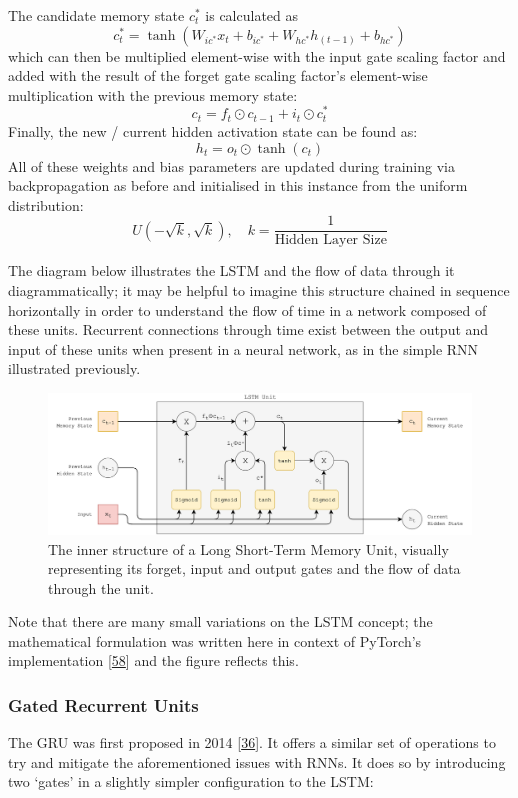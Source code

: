 \documentclass[12pt,]{article}
\begin{document}
The candidate memory state \(c^*_t\) is calculated as
\[c^*_t = \tanh(W_{ic^*} x_t + b_{ic^*} + W_{hc^*} h_{(t-1)} + b_{hc^*})\]
which can then be multiplied element-wise with the input gate scaling
factor and added with the result of the forget gate scaling factor's
element-wise multiplication with the previous memory state:
\[c_t = f_t \odot c_{t-1} + i_t \odot c^*_t\] Finally, the new / current
hidden activation state can be found as: \[h_t = o_t \odot \tanh(c_t)\]
All of these weights and bias parameters are updated during training via
backpropagation as before and initialised in this instance from the
uniform distribution:
\[U(-\sqrt{k}, \sqrt{k}),\quad k = \frac{1}{\text{Hidden Layer Size}}\]

The diagram below illustrates the LSTM and the flow of data through it
diagrammatically; it may be helpful to imagine this structure chained in
sequence horizontally in order to understand the flow of time in a
network composed of these units. Recurrent connections through time
exist between the output and input of these units when present in a
neural network, as in the simple RNN illustrated previously.

\begin{figure}
\centering
\includegraphics{Images/lstm.png}
\caption{The inner structure of a Long Short-Term Memory Unit, visually
representing its forget, input and output gates and the flow of data
through the unit.}
\end{figure}

Note that there are many small variations on the LSTM concept; the
mathematical formulation was written here in context of PyTorch's
implementation {[}\protect\hyperlink{ref-pytorchlstm}{58}{]} and the
figure reflects this.

\hypertarget{gated-recurrent-units}{%
\subsubsection{Gated Recurrent Units}\label{gated-recurrent-units}}

The GRU was first proposed in 2014
{[}\protect\hyperlink{ref-cho2014learning}{36}{]}. It offers a similar
set of operations to try and mitigate the aforementioned issues with
RNNs. It does so by introducing two `gates' in a slightly simpler
configuration to the LSTM:
\end{document}
